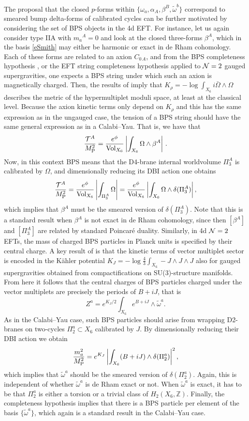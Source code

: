 \documentclass[11pt]{article}
\def\a {\alpha}
\def\b {\beta}
\def\CN {{\cal N}}
\def\be{\begin{equation}}
\def\ee{\end{equation}}
\def\om{\omega}
\def\Om{\Omega}
\newcommand{\IZ}{\mathbb{Z}}
\begin{document}
The proposal that the closed $p$-forms within $\{\om_a, \a_A, \b^B, \tilde{\om}^b\}$ correspond to smeared bump delta-forms of calibrated cycles can be further motivated by considering the set of BPS objects in the 4d EFT. For instance, let us again consider type IIA with $m_a{}^A =0$ and look at the closed three-forms $\b^A$, which in the basis \eqref{eSmith} may either be harmonic or exact in de Rham cohomology. Each of these forms are related to an axion $C_{0\, A}$, and from the BPS completeness hypothesis \cite{Polchinski:2003bq}, or the EFT string completeness hypothesis \cite{Lanza:2021udy} applied to $\CN=2$ gauged supergravities, one expects a BPS string under which such an axion is magnetically charged. Then, the results of \cite{Grana:2005ny,Kashani-Poor:2006ofe} imply that $K_\rho = - \log \int_{X_6} i \bar{\Om} \wedge \Om$  describes the metric of the hypermultiplet moduli space, at least at the classical level. Because the axion kinetic terms only depend on $K_\rho$ and this has the same expression as in the ungauged case, the tension of a BPS string should have the same general expression as in a Calabi--Yau. That is, we have that
\be
\frac{{\cal T}^A}{M_{\rm P}^2} = \frac{e^{\phi}}{{\rm Vol}_{X_6}} \left| \int_{X_6} \Om \wedge \beta^A \right| \, .
\ee
Now, in this context BPS means that the D4-brane internal worldvolume $\Pi_3^A$ is calibrated by $\Omega$, and dimensionally reducing its DBI action one obtains
\be
\frac{{\cal T}^A}{M_{\rm P}^2} =  \frac{e^{\phi}}{{\rm Vol}_{X_6}}  \left| \int_{\Pi_3^A}  \Om \right| =  \frac{e^{\phi}}{{\rm Vol}_{X_6}}  \left| \int_{X_6}  \Om \wedge \delta(\Pi_3^A) \right| ,
\ee
which implies that $\b^A$ must be the smeared version of $\delta(\Pi_3^A)$. Note that this is a standard result when $\b^A$ is not exact in de Rham cohomology, since then $[\b^A]$ and $[\Pi_3^A]$ are related by standard Poincar\'e duality. Similarly, in 4d $\CN=2$ EFTs, the mass of charged BPS particles in Planck units is specified by their central charge. A key result of \cite{Grana:2005ny,Kashani-Poor:2006ofe} is that the kinetic terms of vector multiplet sector is encoded in the K\"ahler potential $K_J = - \log \frac{4}{3}\int_{X_6} - J \wedge J \wedge J$ also for gauged supergravities obtained from compactifications on SU(3)-structure manifolds. From here it follows that the central charges of BPS particles charged under the vector multiplets are precisely the periods of $B+iJ$, that is
\be
Z^a = e^{K_J/2} \int_{X_6} e^{B+iJ} \wedge \tilde{\om}^a .
\ee
As in the Calabi--Yau case, such BPS particles should arise from wrapping D2-branes on two-cycles $\Pi_2^a \subset X_6$  calibrated by $J$. By dimensionally reducing their DBI action we obtain
\be
\frac{m_a^2}{M_{\rm P}^2} = e^{K_J} \left| \int_{X_6} (B+i J)\wedge \delta (\Pi_2^a) \right|^2  ,
\ee
which implies that $\tilde{\om}^a$ should be the smeared version of $\delta(\Pi_2^a)$. Again, this is independent of whether $\tilde{\om}^a$ is de Rham exact or not. When $\tilde{\om}^a$ is exact, it has to be that $\Pi_2^a$ is either a torsion or a trivial class of $H_2(X_6, \IZ)$. Finally, the completeness hypothesis implies that there is a BPS particle per element of the basis $\{\tilde{\om}^a\}$, which again is a standard result in the Calabi--Yau case. 
\end{document}
